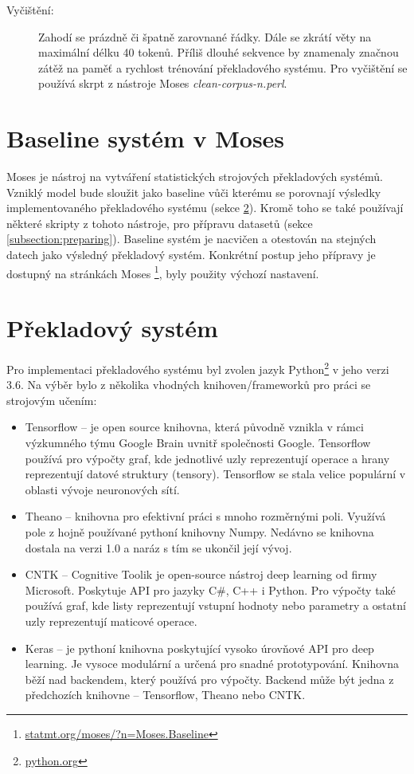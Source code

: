 \begin{description}
  \item[Vyčištění:] Zahodí se prázdně či špatně zarovnané řádky. Dále se zkrátí věty na maximální délku 40  tokenů. Příliš dlouhé sekvence by znamenaly značnou zátěž na paměť a rychlost trénování překladového systému. Pro vyčištění se používá skrpt z nástroje Moses \emph{clean-corpus-n.perl}.
\end{description}



\section{Baseline systém v Moses}\label{section:baseline}
Moses \cite{moses} je nástroj na vytváření statistických strojových překladových systémů. Vzniklý model bude sloužit jako baseline vůči kterému se porovnají výsledky implementovaného překladového systému (sekce \ref{section:nmtSystem}). Kromě toho se také používají některé skripty z tohoto nástroje, pro přípravu datasetů (sekce \ref{subsection:preparing}). Baseline systém je nacvičen a otestován na stejných datech jako výsledný překladový systém. Konkrétní postup jeho přípravy je dostupný na stránkách Moses \footnote{\url{statmt.org/moses/?n=Moses.Baseline}}, byly použity výchozí nastavení.

\section{Překladový systém}\label{section:nmtSystem}
Pro implementaci překladového systému byl zvolen jazyk Python\footnote{\url{python.org}} v jeho verzi 3.6. Na výběr bylo z několika vhodných knihoven/frameworků pro práci se strojovým učením:

\begin{itemize}
  \item Tensorflow -- je open source knihovna, která původně vznikla v rámci výzkumného týmu Google Brain uvnitř společnosti Google. Tensorflow používá pro výpočty graf, kde jednotlivé uzly reprezentují operace a hrany reprezentují datové struktury (tensory). Tensorflow se stala velice populární v oblasti vývoje neuronových sítí.
  \item Theano -- knihovna pro efektivní práci s mnoho rozměrnými poli. Využívá pole z hojně používané pythoní knihovny Numpy. Nedávno se knihovna dostala na verzi 1.0 a naráz s tím se ukončil její vývoj. 
  \item CNTK -- Cognitive Toolik je open-source nástroj deep learning od firmy Microsoft. Poskytuje API pro jazyky C\#, C++ i Python. Pro výpočty také používá graf, kde listy reprezentují vstupní hodnoty nebo parametry a ostatní uzly reprezentují maticové operace.
  \item Keras -- je pythoní knihovna poskytující vysoko úrovňové API pro deep learning. Je vysoce modulární a určená pro snadné prototypování. Knihovna běží nad backendem, který používá pro výpočty. Backend může být jedna z předchozích knihovne -- Tensorflow, Theano nebo CNTK.
\end{itemize}

